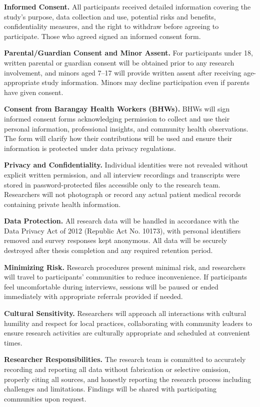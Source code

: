 \documentclass{research}
\begin{document}
\textbf{Informed Consent.} All participants received detailed information covering 
the study's purpose, data collection and use, potential risks and benefits, 
confidentiality measures, and the right to withdraw before agreeing to participate. 
Those who agreed signed an informed consent form.

\textbf{Parental/Guardian Consent and Minor Assent.} For participants under 18, 
written parental or guardian consent will be obtained prior to any research 
involvement, and minors aged 7--17 will provide written assent after receiving 
age-appropriate study information. Minors may decline participation even if parents 
have given consent.

\textbf{Consent from Barangay Health Workers (BHWs).} BHWs will sign informed 
consent forms acknowledging permission to collect and use their personal information, 
professional insights, and community health observations. The form will clarify how 
their contributions will be used and ensure their information is protected under 
data privacy regulations.

\textbf{Privacy and Confidentiality.} Individual identities were not revealed without 
explicit written permission, and all interview recordings and transcripts were stored 
in password-protected files accessible only to the research team. Researchers will 
not photograph or record any actual patient medical records containing private health 
information.

\textbf{Data Protection.} All research data will be handled in accordance with the 
Data Privacy Act of 2012 (Republic Act No. 10173), with personal identifiers removed 
and survey responses kept anonymous. All data will be securely destroyed after thesis 
completion and any required retention period.

\textbf{Minimizing Risk.} Research procedures present minimal risk, and researchers 
will travel to participants' communities to reduce inconvenience. If participants feel 
uncomfortable during interviews, sessions will be paused or ended immediately with 
appropriate referrals provided if needed.

\textbf{Cultural Sensitivity.} Researchers will approach all interactions with 
cultural humility and respect for local practices, collaborating with community 
leaders to ensure research activities are culturally appropriate and scheduled at 
convenient times.

\textbf{Researcher Responsibilities.} The research team is committed to accurately 
recording and reporting all data without fabrication or selective omission, properly 
citing all sources, and honestly reporting the research process including challenges 
and limitations. Findings will be shared with participating communities upon request.
\end{document}
